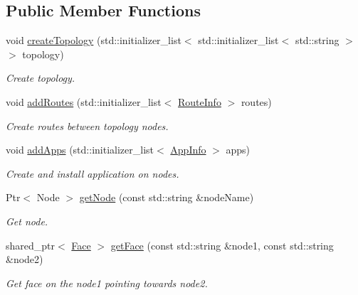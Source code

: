 \subsection*{Public Member Functions}
\begin{DoxyCompactItemize}
\item 
void \hyperlink{classns3_1_1ndn_1_1ScenarioHelper_a8d0cfc543a78db151a0e0cc353a336eb}{create\+Topology} (std\+::initializer\+\_\+list$<$ std\+::initializer\+\_\+list$<$ std\+::string $>$$>$ topology)
\begin{DoxyCompactList}\small\item\em Create topology. \end{DoxyCompactList}\item 
void \hyperlink{classns3_1_1ndn_1_1ScenarioHelper_af78d40897640b8fa20f9e7482028acfc}{add\+Routes} (std\+::initializer\+\_\+list$<$ \hyperlink{structns3_1_1ndn_1_1ScenarioHelper_1_1RouteInfo}{Route\+Info} $>$ routes)
\begin{DoxyCompactList}\small\item\em Create routes between topology nodes. \end{DoxyCompactList}\item 
void \hyperlink{classns3_1_1ndn_1_1ScenarioHelper_a14a9eeb69c4f52c5bfdc45e1e89fb624}{add\+Apps} (std\+::initializer\+\_\+list$<$ \hyperlink{structns3_1_1ndn_1_1ScenarioHelper_1_1AppInfo}{App\+Info} $>$ apps)
\begin{DoxyCompactList}\small\item\em Create and install application on nodes. \end{DoxyCompactList}\item 
Ptr$<$ Node $>$ \hyperlink{classns3_1_1ndn_1_1ScenarioHelper_a838baa969b98bd3c137d134bb89b5e83}{get\+Node} (const std\+::string \&node\+Name)
\begin{DoxyCompactList}\small\item\em Get node. \end{DoxyCompactList}\item 
shared\+\_\+ptr$<$ \hyperlink{classnfd_1_1Face}{Face} $>$ \hyperlink{classns3_1_1ndn_1_1ScenarioHelper_a3c6114d09b7d79cb98efa917bdcb6dc6}{get\+Face} (const std\+::string \&node1, const std\+::string \&node2)
\begin{DoxyCompactList}\small\item\em Get face on the {\ttfamily node1} pointing towards {\ttfamily node2}. \end{DoxyCompactList}\end{DoxyCompactItemize}


